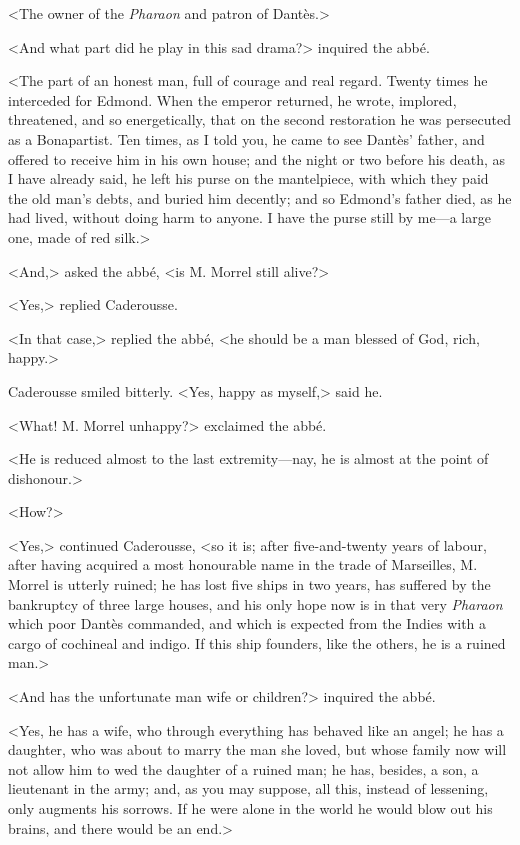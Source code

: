  <The owner of the \textit{Pharaon} and patron of Dantès.> 

 <And what part did he play in this sad drama?> inquired the abbé. 

 <The part of an honest man, full of courage and real regard. Twenty times he interceded for Edmond. When the emperor returned, he wrote, implored, threatened, and so energetically, that on the second restoration he was persecuted as a Bonapartist. Ten times, as I told you, he came to see Dantès' father, and offered to receive him in his own house; and the night or two before his death, as I have already said, he left his purse on the mantelpiece, with which they paid the old man's debts, and buried him decently; and so Edmond's father died, as he had lived, without doing harm to anyone. I have the purse still by me—a large one, made of red silk.> 

 <And,> asked the abbé, <is M. Morrel still alive?> 

 <Yes,> replied Caderousse. 

 <In that case,> replied the abbé, <he should be a man blessed of God, rich, happy.> 

 Caderousse smiled bitterly. <Yes, happy as myself,> said he. 

 <What! M. Morrel unhappy?> exclaimed the abbé. 

 <He is reduced almost to the last extremity—nay, he is almost at the point of dishonour.> 

 <How?> 

 <Yes,> continued Caderousse, <so it is; after five-and-twenty years of labour, after having acquired a most honourable name in the trade of Marseilles, M. Morrel is utterly ruined; he has lost five ships in two years, has suffered by the bankruptcy of three large houses, and his only hope now is in that very \textit{Pharaon} which poor Dantès commanded, and which is expected from the Indies with a cargo of cochineal and indigo. If this ship founders, like the others, he is a ruined man.> 

 <And has the unfortunate man wife or children?> inquired the abbé. 

 <Yes, he has a wife, who through everything has behaved like an angel; he has a daughter, who was about to marry the man she loved, but whose family now will not allow him to wed the daughter of a ruined man; he has, besides, a son, a lieutenant in the army; and, as you may suppose, all this, instead of lessening, only augments his sorrows. If he were alone in the world he would blow out his brains, and there would be an end.> 

